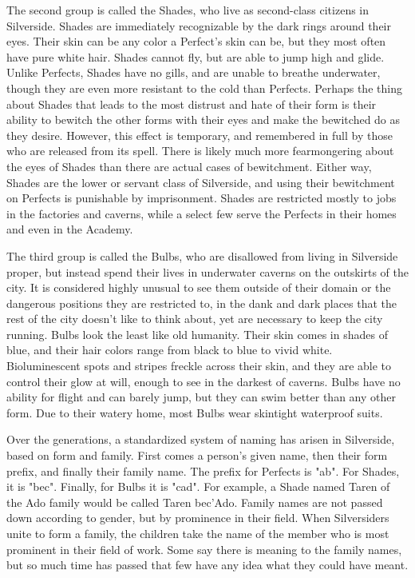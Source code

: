\documentclass[blue]{Silversiders}
\begin{document}
The second group is called the Shades, who live as second-class citizens in Silverside. Shades are immediately recognizable by the dark rings around their eyes. Their skin can be any color a Perfect's skin can be, but they most often have pure white hair. Shades cannot fly, but are able to jump high and glide. Unlike Perfects, Shades have no gills, and are unable to breathe underwater, though they are even more resistant to the cold than Perfects. Perhaps the thing about Shades that leads to the most distrust and hate of their form is their ability to bewitch the other forms with their eyes and make the bewitched do as they desire. However, this effect is temporary, and remembered in full by those who are released from its spell. There is likely much more fearmongering about the eyes of Shades than there are actual cases of bewitchment. Either way, Shades are the lower or servant class of Silverside, and using their bewitchment on Perfects is punishable by imprisonment. Shades are restricted mostly to jobs in the factories and caverns, while a select few serve the Perfects in their homes and even in the Academy.

The third group is called the Bulbs, who are disallowed from living in Silverside proper, but instead spend their lives in underwater caverns on the outskirts of the city. It is considered highly unusual to see them outside of their domain or the dangerous positions they are restricted to, in the dank and dark places that the rest of the city doesn't like to think about, yet are necessary to keep the city running. Bulbs look the least like old humanity. Their skin comes in shades of blue, and their hair colors range from black to blue to vivid white. Bioluminescent spots and stripes freckle across their skin, and they are able to control their glow at will, enough to see in the darkest of caverns. Bulbs have no ability for flight and can barely jump, but they can swim better than any other form. Due to their watery home, most Bulbs wear skintight waterproof suits.

Over the generations, a standardized system of naming has arisen in Silverside, based on form and family. First comes a person's given name, then their form prefix, and finally their family name. The prefix for Perfects is "ab". For Shades, it is "bec". Finally, for Bulbs it is "cad". For example, a Shade named Taren of the Ado family would be called Taren bec'Ado. Family names are not passed down according to gender, but by prominence in their field. When Silversiders unite to form a family, the children take the name of the member who is most prominent in their field of work. Some say there is meaning to the family names, but so much time has passed that few have any idea what they could have meant.
\end{document}
